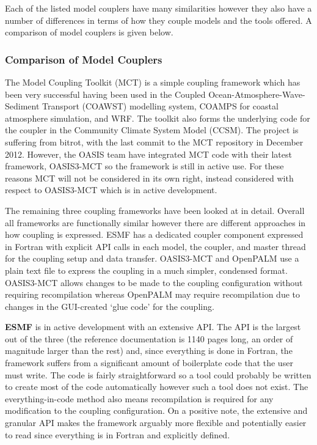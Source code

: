 \documentclass{acm_proc_article-sp}
\renewcommand{\_}{\underscore\hspace{0pt}}
\begin{document}
Each of the listed model couplers have many similarities however they also have
a number of differences in terms of how they couple models and the tools
offered. A comparison of model couplers is given below.

\subsubsection*{Comparison of Model Couplers}

The Model Coupling Toolkit (MCT) \cite{Larson2005,Jacob2005} is a simple
coupling framework which has been very successful having been used in the
Coupled Ocean-Atmosphere-Wave-Sediment Transport (COAWST) modelling system,
COAMPS for coastal atmosphere simulation, and WRF. The toolkit also forms the
underlying code for the coupler in the Community Climate System Model (CCSM).
The project is suffering from bitrot, with the last commit to the MCT repository
in December 2012. However, the OASIS team have integrated MCT code with their
latest framework, OASIS3-MCT so the framework is still in active use. For these
reasons MCT will not be considered in its own right, instead considered with
respect to OASIS3-MCT which is in active development.

The remaining three coupling frameworks have been looked at in detail. Overall
all frameworks are functionally similar however there are different approaches
in how coupling is expressed. ESMF has a dedicated coupler component expressed
in Fortran with explicit API calls in each model, the coupler, and master thread
for the coupling setup and data transfer. OASIS3-MCT and OpenPALM use a plain
text file to express the coupling in a much simpler, condensed format.
OASIS3-MCT allows changes to be made to the coupling configuration without
requiring recompilation whereas OpenPALM may require recompilation due to
changes in the GUI-created `glue code' for the coupling.

\textbf{ESMF} is in active development with an extensive API. The API is the
largest out of the three (the reference documentation is 1140 pages long, an
order of magnitude larger than the rest) and, since everything is done in
Fortran, the framework suffers from a significant amount of boilerplate code
that the user must write. The code is fairly straightforward so a tool could
probably be written to create most of the code automatically however such a tool
does not exist. The everything-in-code method also means recompilation is
required for any modification to the coupling configuration. On a positive note,
the extensive and granular API makes the framework arguably more flexible and
potentially easier to read since everything is in Fortran and explicitly
defined.
\end{document}
